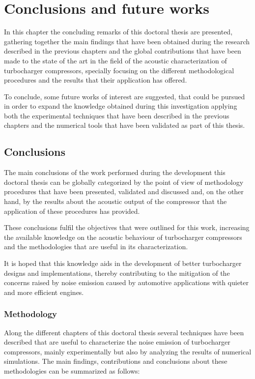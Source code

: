 \chapter{Conclusions and future works}
\label{cap:conclus}

In this chapter the concluding remarks of this doctoral thesis are presented, gathering together the main findings that have been obtained during the research described in the previous chapters and the global contributions that have been made to the state of the art in the field of the acoustic characterization of turbocharger compressors, specially focusing on the different methodological procedures and the results that their application has offered.

To conclude, some future works of interest are suggested, that could be pursued in order to expand the knowledge obtained during this investigation applying both the experimental techniques that have been described in the previous chapters and the numerical tools that have been validated as part of this thesis.

\section{Conclusions}

The main conclusions of the work performed during the development this doctoral thesis can be globally categorized by the point of view of methodology procedures that have been presented, validated and discussed and, on the other hand, by the results about the acoustic output of the compressor that the application of these procedures has provided.

These conclusions fulfil the objectives that were outlined for this work, increasing the available knowledge on the acoustic behaviour of turbocharger compressors and the methodologies that are useful in its characterization.

It is hoped that this knowledge aids in the development of better turbocharger designs and implementations, thereby contributing to the mitigation of the concerns raised by noise emission caused by automotive applications with quieter and more efficient engines.

\subsection{Methodology}

Along the different chapters of this doctoral thesis several techniques have been described that are useful to characterize the noise emission of turbocharger compressors, mainly experimentally but also by analyzing the results of numerical simulations. The main findings, contributions and conclusions about these methodologies can be summarized as follows: 

